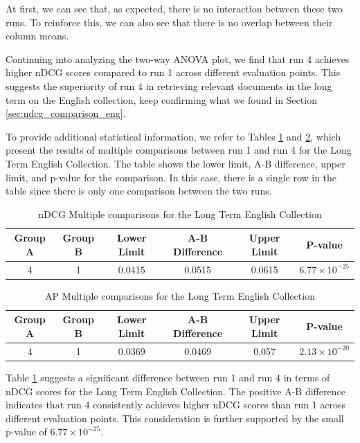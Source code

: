 At first, we can see that, as expected, there is no interaction between these two runs. To reinforce this, we can also see that there is no overlap between their column means.

Continuing into analyzing the two-way \ac{ANOVA} plot, we find that run 4 achieves higher \ac{nDCG} scores compared to run 1 across different evaluation points. 
This suggests the superiority of run 4 in retrieving relevant documents in the long term on the English collection, keep confirming what we found in Section \ref{sec:ndcg_comparison_eng}. 

To provide additional statistical information, we refer to Tables \ref{table:lt_anova_eng} and \ref{table:lt_anova_eng_ap}, which present the results of multiple comparisons between run 1 and run 4 for the Long Term English Collection. 
The table shows the lower limit, A-B difference, upper limit, and p-value for the comparison. 
In this case, there is a single row in the table since there is only one comparison between the two runs.

\begin{table}[!h]
    \centering
    \caption{\ac{nDCG} Multiple comparisons for the Long Term English Collection}
    \label{table:lt_anova_eng}
    \begin{tabular}{cccccc}
    \hline
    Group A & Group B & Lower Limit & A-B Difference & Upper Limit & P-value \\
    \hline
    4 & 1 & 0.0415 & 0.0515 & 0.0615 & $6.77 \times 10^{-25}$ \\
    \hline
    \end{tabular}
\end{table}

\begin{table}[!h]
    \centering
    \caption{\ac{AP} Multiple comparisons for the Long Term English Collection}
    \label{table:lt_anova_eng_ap}
    \begin{tabular}{cccccc}
    \hline
    Group A & Group B & Lower Limit & A-B Difference & Upper Limit & P-value \\
    \hline
    4 & 1 & 0.0369 & 0.0469 & 0.057 & $2.13 \times 10^{-20}$ \\
    \hline
    \end{tabular}
\end{table}
    
Table \ref{table:lt_anova_eng} suggests a significant difference between run 1 and run 4 in terms of \ac{nDCG} scores for the Long Term English Collection. 
The positive A-B difference indicates that run 4 consistently achieves higher \ac{nDCG} scores than run 1 across different evaluation points. This consideration is further supported by the small p-value of $6.77 \times 10^{-25}$.

